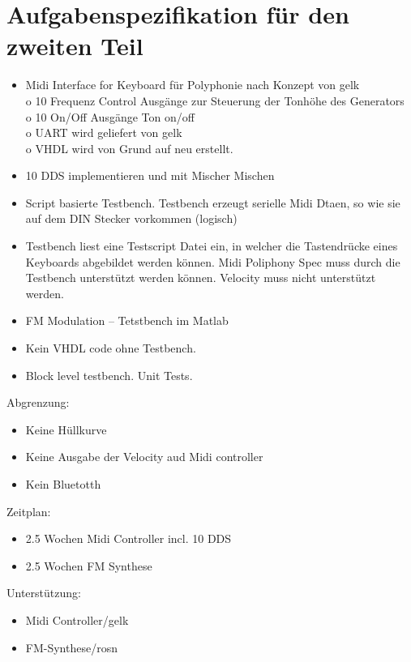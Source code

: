 \chapter{Aufgabenspezifikation für den zweiten Teil}\label{chap.anhang_aufgabenstellung_neu}

\begin{itemize}
\item Midi Interface for Keyboard für Polyphonie nach Konzept von gelk\\
o   10 Frequenz Control Ausgänge zur Steuerung der Tonhöhe des Generators\\
o   10 On/Off Ausgänge Ton on/off\\
o   UART wird geliefert von gelk\\
o   VHDL wird von Grund auf neu erstellt.
\item 10 DDS implementieren und mit Mischer Mischen
\item Script basierte Testbench. Testbench erzeugt serielle Midi Dtaen, so wie sie auf dem DIN Stecker vorkommen (logisch)
\item Testbench liest eine Testscript Datei ein, in welcher die Tastendrücke eines Keyboards abgebildet werden können. Midi Poliphony Spec muss durch die Testbench unterstützt werden können. Velocity muss nicht unterstützt werden.
\item FM Modulation – Tetstbench im Matlab
\item Kein VHDL code ohne Testbench.
\item Block level testbench. Unit Tests.
\end{itemize}  

Abgrenzung:
\begin{itemize}
\item Keine Hüllkurve
\item Keine Ausgabe der Velocity aud Midi controller
\item Kein Bluetotth
\end{itemize} 
Zeitplan:
\begin{itemize}
\item 2.5 Wochen Midi Controller incl. 10 DDS
\item 2.5 Wochen FM Synthese 
\end{itemize} 

Unterstützung:
\begin{itemize}
\item Midi Controller/gelk
\item FM-Synthese/rosn
\end{itemize} 

